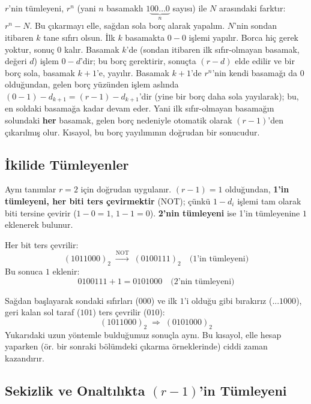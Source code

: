 \begin{bilginot}
$r$'nin tümleyeni, $r^n$ (yani $n$ basamaklı $1\underbrace{00\ldots0}_{n}$ sayısı) ile $N$
arasındaki farktır: $r^n-N$. Bu çıkarmayı elle, sağdan sola borç alarak yapalım. $N$'nin
sondan itibaren $k$ tane sıfırı olsun. İlk $k$ basamakta $0-0$ işlemi yapılır. Borca hiç
gerek yoktur, sonuç $0$ kalır. Basamak $k$'de (sondan itibaren ilk sıfır-olmayan basamak,
değeri $d$) işlem $0-d$'dir; bu borç gerektirir, sonuçta $(r-d)$ elde edilir ve bir borç sola,
basamak $k{+}1$'e, yayılır. Basamak $k{+}1$'de $r^n$'nin kendi basamağı da $0$
olduğundan, gelen borç yüzünden işlem aslında $(0-1)-d_{k+1} = (r-1)-d_{k+1}$'dir (yine bir
borç daha sola yayılarak); bu, en soldaki basamağa kadar devam eder. Yani ilk
sıfır-olmayan basamağın solundaki \textbf{her} basamak, gelen borç nedeniyle otomatik olarak
$(r{-}1)$'den çıkarılmış olur. Kısayol, bu borç yayılımının doğrudan bir sonucudur.
\end{bilginot}

\subsection{İkilide Tümleyenler}
\label{sec:tumleyen-ikili}

Aynı tanımlar $r=2$ için doğrudan uygulanır. $(r{-}1)=1$ olduğundan, \textbf{1'in tümleyeni,
her biti ters çevirmektir} (NOT); çünkü $1-d_i$ işlemi tam olarak biti tersine çevirir
($1-0=1$, $1-1=0$). \textbf{2'nin tümleyeni} ise 1'in tümleyenine $1$ eklenerek bulunur.

\begin{ornek}
Her bit ters çevrilir:
\[
(1011000)_2 \;\xrightarrow{\text{NOT}}\; (0100111)_2 \quad \text{(1'in tümleyeni)}
\]
Bu sonuca $1$ eklenir:
\[
0100111+1=0101000 \quad \text{(2'nin tümleyeni)}
\]
\end{ornek}

\begin{ornek}
Sağdan başlayarak sondaki sıfırları ($000$) ve ilk $1$'i olduğu gibi bırakırız ($...1000$),
geri kalan sol taraf ($101$) ters çevrilir ($010$):
\[
(1011000)_2 \;\Rightarrow\; (0101000)_2
\]
Yukarıdaki uzun yöntemle bulduğumuz sonuçla aynı. \checkmark Bu kısayol, elle hesap yaparken
(ör. bir sonraki bölümdeki çıkarma örneklerinde) ciddi zaman kazandırır.
\end{ornek}

\subsection{Sekizlik ve Onaltılıkta $(r{-}1)$'in Tümleyeni}
\label{sec:tumleyen-sekizlik-onaltilik}


